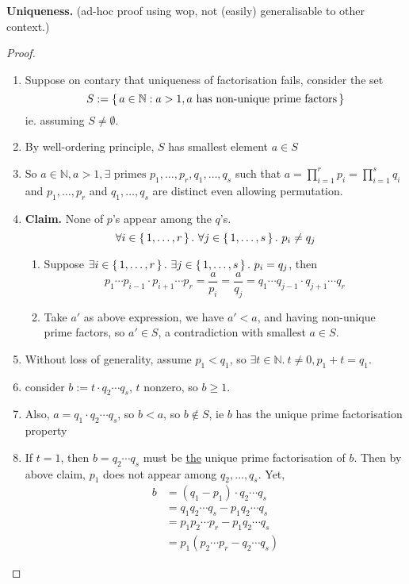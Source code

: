 \documentclass[12pt]{article}
\newenvironment{prf}
{
    \begin{proof}
        \hfill
        \begin{enumerate}[label*=\arabic*.]
                }
                {
                \hfill\qedsymbol
        \end{enumerate}
    \renewcommand{\qedsymbol}{}
    \end{proof}
}
\numberwithin{equation}{dummy}
\theoremstyle{definition}
\newcommand{\nat}{\mathbb{N}}
\begin{document}
\newpage
\textbf{Uniqueness.} (ad-hoc proof using wop, not (easily) generalisable to other context.)
\begin{prf}
\item Suppose on contary that uniqueness of factorisation fails, consider the set
    $$S:= \set{a\in\nat: a>1, a\text{ has non-unique prime factors}}$$
    ie. assuming $S\ne\emptyset$.
\item By well-ordering principle, $S$ has smallest element $a \in S$
\item So $a\in\nat, a>1, \exists \text{ primes } p_1, \dots, p_r, q_1, \dots, q_s$
    such that $a = \prod\limits_{i=1}^{r} p_i = \prod\limits_{i=1}^{s} q_i$ and
    $p_1,\dots,p_r$ and $q_1,\dots,q_s$ are distinct even allowing permutation.
\item[] \textbf{Claim.} None of $p$'s appear among the $q$'s.
    $$\forall i\in\set{1,\dots,r}.~ \forall j\in\set{1,\dots,s}.~ p_i \ne q_j$$
    \begin{enumerate}[label=\roman*.]
        \item Suppose $\exists i\in\set{1,\dots,r}.~\exists j\in\set{1,\dots,s}.~ p_i=q_j$, then
            $$p_1\cdots p_{i-1}\cdot p_{i+1} \cdots p_r =
            \frac{a}{p_i} = \frac{a}{q_j} =
            q_1\cdots q_{j-1}\cdot q_{j+1} \cdots q_r$$
        \item Take $a'$ as above expression, we have $a' < a$, and having non-unique prime factors, so $a'\in S$, a contradiction with smallest $a\in S$.
    \end{enumerate}
\item Without loss of generality, assume $p_1 < q_1$, so $\exists t\in\nat.~ t\ne 0, p_1 + t = q_1$.
\item consider $b := t\cdot q_2\cdots q_s$, $t$ nonzero, so $b\geq 1$.
\item Also, $a = q_1\cdot q_2\cdots q_s$, so $b<a$, so $b\not\in S$, ie $b$ has the unique prime factorisation property
\item If $t = 1$, then $b = q_2\cdots q_s$ must be \underline{the} unique prime factorisation of $b$. Then by above claim, $p_1$ does not appear among $q_2,\dots,q_s$. Yet,
    \begin{align*}
        b &= (q_1 - p_1)\cdot q_2\cdots q_s     \\
        &= q_1q_2\cdots q_s - p_1q_2\cdots q_s  \\
        &= p_1p_2\cdots p_r - p_1q_2\cdots q_s  \\
        &= p_1(p_2\cdots p_r - q_2\cdots q_s)
    \end{align*}

\end{prf}
\end{document}
